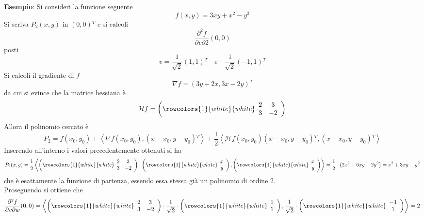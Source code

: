 \documentclass[a4paper]{extarticle}
\begin{document}
 \vspace{2em}
 \noindent
 \textbf{Esempio}: Si consideri la funzione seguente
 \[f(x,y) = 3xy+x^2-y^2\]
 Si scriva $P_2(x,y)$ in $(0,0){^T}$ e si calcoli
 \[\dfrac{\partial^2 f}{\partial v \partial 2}(0,0)\]
 posti
 \[v=\dfrac{1}{\sqrt{2}} (1,1){^T} \hspace{1em} \text{e} \hspace{1em} \dfrac{1}{\sqrt{2}} (-1,1){^T}\]
 Si calcoli il gradiente di $f$
 \[\nabla f = (3y+2x,3x-2y){^T}\]
 da cui si evince che la matrice hessiana è
 \[\mathcal{H} f = \left(
    \rowcolors{1}{white}{white}    
    \begin{array}{cc}
        2 & 3\\
        3 & -2
    \end{array}
 \right)\]
 Allora il polinomio cercato è
 \[P_2=f(x_0,y_0)+\left<\nabla f(x_0,y_0), (x-x_0,y-y_0){^T}\right> + \dfrac{1}{2} \left<\mathcal{H}f(x_0,y_0)(x-x_0,y-y_0){^T},(x-x_0,y-y_0){^T}\right>\]
Inserendo all'interno i valori precedentemente ottenuti si ha
\[P_2(x,y) = \dfrac{1}{2} \left<
    \left(
    \rowcolors{1}{white}{white}    
    \begin{array}{cc}
        2 & 3\\
        3 & -2
    \end{array}
 \right) \cdot \left(
    \rowcolors{1}{white}{white}    
    \begin{array}{c}
        x\\
        y
    \end{array}
 \right),
 \left(
    \rowcolors{1}{white}{white}    
    \begin{array}{c}
        x\\
        y
    \end{array}
 \right)
\right> = \dfrac{1}{2} \cdot \left(2x^2+6xy-2y^2\right) = x^2+3xy-y^2\]
che è esattamente la funzione di partenza, essendo essa stessa già un polinomio di ordine $2$.\\
Proseguendo si ottiene che
\[\dfrac{\partial^2 f}{\partial v \partial w} (0,0) = \left<
    \left(
    \rowcolors{1}{white}{white}    
    \begin{array}{cc}
        2 & 3\\
        3 & -2
    \end{array}
 \right) \cdot \dfrac{1}{\sqrt{2}} \cdot \left(
    \rowcolors{1}{white}{white}    
    \begin{array}{c}
        1\\
        1
    \end{array}
 \right), \dfrac{1}{\sqrt{2}} \cdot \left(
    \rowcolors{1}{white}{white}    
    \begin{array}{c}
        -1\\
        1
    \end{array}
 \right)
\right> = 2\]
\end{document}
